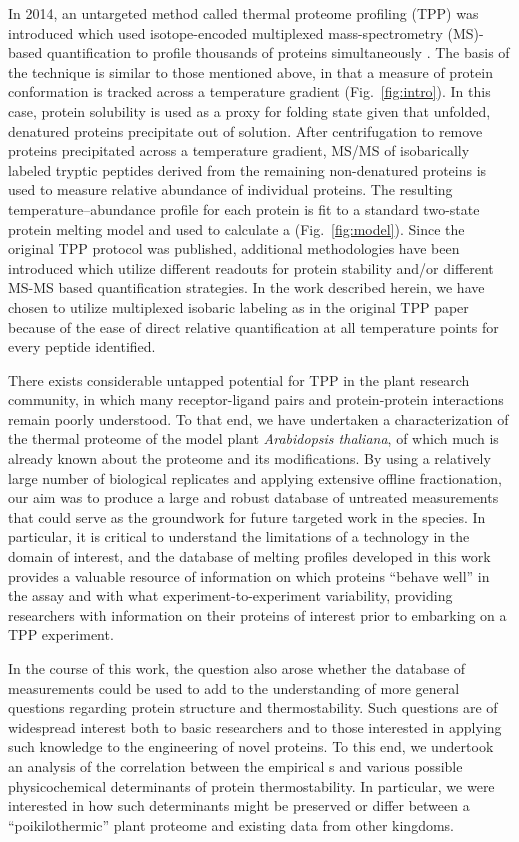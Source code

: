 In 2014, an untargeted method called thermal proteome profiling (TPP) was
introduced which used isotope-encoded multiplexed mass-spectrometry (MS)-based
quantification to profile thousands of proteins simultaneously
\cite{savitski_tracking_2014}. The basis of the technique is similar to those
mentioned above, in that a measure of protein conformation is tracked across a
temperature gradient (Fig.\ \ref{fig:intro}). In this case, protein solubility
is used as a proxy for folding state given that unfolded, denatured proteins
precipitate out of solution. After centrifugation to remove proteins
precipitated across a temperature gradient, MS/MS of isobarically labeled
tryptic peptides derived from the remaining non-denatured proteins is used to
measure relative abundance of individual proteins. The resulting
temperature--abundance profile for each protein is fit to a standard two-state
protein melting model and used to calculate a \Tm{} (Fig.\ \ref{fig:model}).
Since the original TPP protocol was published, additional methodologies have
been introduced which utilize different readouts for protein stability and/or
different MS-MS based quantification strategies. In the work described herein,
we have chosen to utilize multiplexed isobaric labeling as in the original TPP
paper because of the ease of direct relative quantification at all temperature
points for every peptide identified.

There exists considerable untapped potential for TPP in the plant research
community, in which many receptor-ligand pairs and protein-protein
interactions remain poorly understood. To that end, we have undertaken a
characterization of the thermal proteome of the model plant
\textit{Arabidopsis thaliana}, of which much is already known about the
proteome and its modifications. By using a relatively large number of
biological replicates and applying extensive offline fractionation, our aim
was to produce a large and robust database of untreated \Tm{} measurements
that could serve as the groundwork for future targeted work in the species. In
particular, it is critical to understand the limitations of a technology in
the domain of interest, and the database of melting profiles developed in this
work provides a valuable resource of information on which proteins ``behave
well'' in the assay and with what experiment-to-experiment variability,
providing researchers with information on their proteins of interest prior to
embarking on a TPP experiment.

In the course of this work, the question also arose whether the database of
\Tm{} measurements could be used to add to the understanding of more general
questions regarding protein structure and thermostability. Such questions are
of widespread interest both to basic researchers and to those interested in
applying such knowledge to the engineering of novel proteins. To this end, we
undertook an analysis of the correlation between the empirical \Tm{}s and
various possible physicochemical determinants of protein thermostability. In
particular, we were interested in how such determinants might be preserved or
differ between a ``poikilothermic'' plant proteome and existing data from
other kingdoms.

